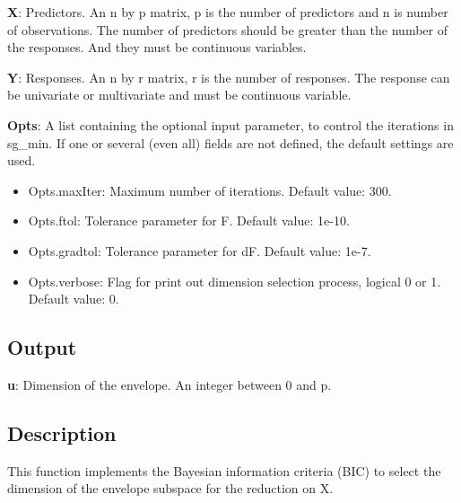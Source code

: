 \documentclass[a4paper,11pt,openany]{memoir}
\begin{document}
\begin{par}
\textbf{X}: Predictors. An n by p matrix, p is the number of predictors and n is number of observations. The number of predictors should be greater than the number of the responses. And they must be continuous variables.
\end{par} \vspace{1em}
\begin{par}
\textbf{Y}: Responses. An n by r matrix, r is the number of responses. The response can be univariate or multivariate and must be continuous variable.
\end{par} \vspace{1em}
\begin{par}
\textbf{Opts}: A list containing the optional input parameter, to control the iterations in sg\_min. If one or several (even all) fields are not defined, the default settings are used.
\end{par} \vspace{1em}
\begin{itemize}
\setlength{\itemsep}{-1ex}
   \item Opts.maxIter: Maximum number of iterations.  Default value: 300.
   \item Opts.ftol: Tolerance parameter for F.  Default value: 1e-10.
   \item Opts.gradtol: Tolerance parameter for dF.  Default value: 1e-7.
   \item Opts.verbose: Flag for print out dimension selection process, logical 0 or 1. Default value: 0.
\end{itemize}


\subsection*{Output}

\begin{par}
\textbf{u}: Dimension of the envelope. An integer between 0 and p.
\end{par} \vspace{1em}


\subsection*{Description}

\begin{par}
This function implements the Bayesian information criteria (BIC) to select the dimension of the envelope subspace for the reduction on X.
\end{par} \vspace{1em}
\end{document}
